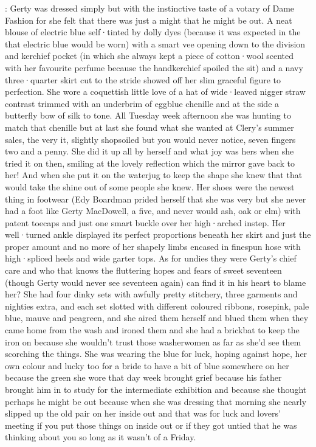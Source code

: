:
Gerty was dressed simply
but with the instinctive taste
of a votary of Dame Fashion
for she felt
that there was just a might
that he might be out.
A neat blouse of electric blue
self·tinted by dolly dyes
(because it was expected
in the 
that electric blue would be worn)
with a smart vee
opening down to the division
and kerchief pocket
(in which
she always kept a piece of cotton·wool
scented with her favourite perfume
because the handkerchief spoiled the sit)
and a navy three·quarter skirt
cut to the stride
showed off her slim graceful figure
to perfection.
She wore a coquettish little love of a hat
of wide·leaved nigger straw
contrast trimmed
with an underbrim of eggblue chenille
and at the side
a butterfly bow of silk to tone.
All Tuesday week afternoon
she was hunting to match that chenille
but at last
she found what she wanted
at Clery's summer sales,
the very it,
slightly shopsoiled
but you would never notice,
seven fingers two and a penny.
She did it up all by herself and what joy was hers when she tried it on then,
smiling at the lovely reflection which the mirror gave back to her!
And when she put it on the waterjug to keep the shape she knew that that
would take the shine out of some people she knew.
Her shoes were the
newest thing in footwear (Edy Boardman prided herself that she was very
 but she never had a foot like Gerty MacDowell,
a five,
and never
would ash,
oak or elm) with patent toecaps and just one smart buckle over
her high·arched instep.
Her well·turned ankle displayed its perfect
proportions beneath her skirt and just the proper amount and no more of
her shapely limbs encased in finespun hose
with high·spliced heels and wide
garter tops.
As for undies they were Gerty's chief care and who that knows
the fluttering hopes and fears of sweet seventeen (though Gerty would
never see seventeen again) can find it in his heart to blame her?
She had
four dinky sets with awfully pretty stitchery,
three garments and
nighties extra,
and each set slotted with different coloured ribbons,
rosepink,
pale blue,
mauve and peagreen,
and she aired them herself
and blued them when they came home from the wash and ironed them
and she had a brickbat to keep the iron on because she wouldn't trust
those washerwomen as far as she'd see them scorching the things.
She was wearing the blue for luck,
hoping against hope,
her own colour and lucky too for a bride to have a bit of blue somewhere
on her because the green she wore that day week brought grief because
his father brought him in to study for the intermediate exhibition
and because she thought perhaps he might be out because when she was
dressing that morning she nearly slipped up the old pair on her inside out
and that was for luck and lovers' meeting if you put those things on
inside out or if they got untied that he was thinking about you so long
as it wasn't of a Friday.


